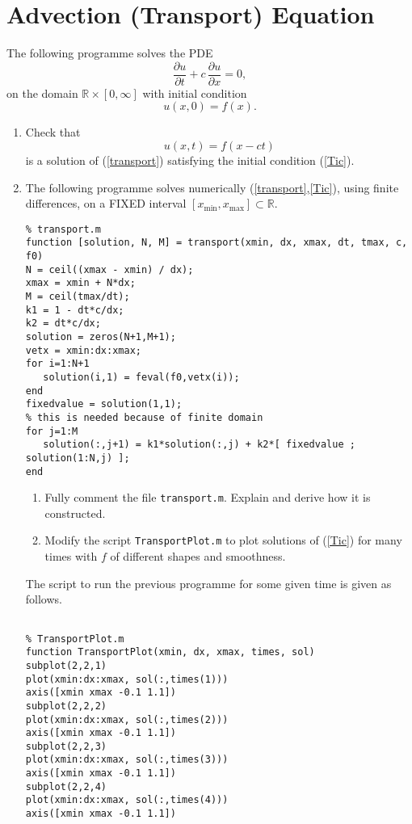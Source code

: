 \documentclass[12pt]{article}
\newcommand{\p}{\partial}
\def\R{\mathbb{R}}
\newcommand{\be}{\begin{equation}}
\newcommand{\ee}{\end{equation}}
\begin{document}
\newpage

\section{Advection (Transport) Equation}

The following programme solves the PDE
\be \label{transport} \frac{\p u}{\p t}+c\,\frac{\p u}{\p x}=0, \ee
on the domain $\R\times[0,\infty]$ with initial condition
\be\label{Tic} u(x,0)=f(x). \ee

\begin{enumerate}\item Check that
$$ u(x,t)=f(x-ct) $$
is a solution of (\ref{transport}) satisfying the initial condition (\ref{Tic}).

\item The following programme solves numerically (\ref{transport},\ref{Tic}), using finite differences,
on a FIXED interval $[x_{\min},x_{\max}]\subset\R$.

\begin{verbatim}
% transport.m
function [solution, N, M] = transport(xmin, dx, xmax, dt, tmax, c, f0)
N = ceil((xmax - xmin) / dx);
xmax = xmin + N*dx;
M = ceil(tmax/dt);
k1 = 1 - dt*c/dx;
k2 = dt*c/dx;
solution = zeros(N+1,M+1);
vetx = xmin:dx:xmax;
for i=1:N+1
   solution(i,1) = feval(f0,vetx(i));
end
fixedvalue = solution(1,1);
% this is needed because of finite domain
for j=1:M
   solution(:,j+1) = k1*solution(:,j) + k2*[ fixedvalue ; solution(1:N,j) ];
end

\end{verbatim}

\begin{enumerate}\item Fully comment the file \verb|transport.m|. Explain and derive how it is constructed.  
\item Modify the script \verb|TransportPlot.m| to plot solutions of (\ref{Tic}) for many times with $f$ of different shapes and smoothness.
\end{enumerate}

\newpage

The script to run the previous programme for some given time is given as follows.

\begin{verbatim}

% TransportPlot.m
function TransportPlot(xmin, dx, xmax, times, sol)
subplot(2,2,1)
plot(xmin:dx:xmax, sol(:,times(1)))
axis([xmin xmax -0.1 1.1])
subplot(2,2,2)
plot(xmin:dx:xmax, sol(:,times(2)))
axis([xmin xmax -0.1 1.1])
subplot(2,2,3)
plot(xmin:dx:xmax, sol(:,times(3)))
axis([xmin xmax -0.1 1.1])
subplot(2,2,4)
plot(xmin:dx:xmax, sol(:,times(4)))
axis([xmin xmax -0.1 1.1])

\end{verbatim}

\end{enumerate}
\end{document}
